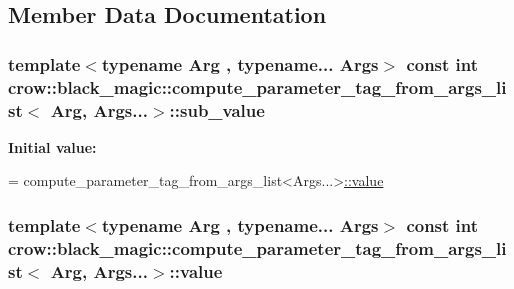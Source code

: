 \subsection{Member Data Documentation}
\hypertarget{structcrow_1_1black__magic_1_1compute__parameter__tag__from__args__list_3_01_arg_00_01_args_8_8_8_4_a4bbefabf41046c28166fcbff53fa4a09}{
\subsubsection[{sub\-\_\-value}]{\setlength{\rightskip}{0pt plus 5cm}template$<$typename Arg , typename... Args$>$ const int {\bf crow\-::black\-\_\-magic\-::compute\-\_\-parameter\-\_\-tag\-\_\-from\-\_\-args\-\_\-list}$<$ Arg, Args...$>$\-::sub\-\_\-value\hspace{0.3cm}{\ttfamily [static]}}}\label{structcrow_1_1black__magic_1_1compute__parameter__tag__from__args__list_3_01_arg_00_01_args_8_8_8_4_a4bbefabf41046c28166fcbff53fa4a09}
{\bfseries Initial value\-:}
\begin{DoxyCode}
= 
                compute\_parameter\_tag\_from\_args\_list<Args...>\hyperlink{structcrow_1_1black__magic_1_1compute__parameter__tag__from__args__list_3_01_arg_00_01_args_8_8_8_4_a14aa3a0f1dc86b1e62539ffcec6701af}{::value}
\end{DoxyCode}
\hypertarget{structcrow_1_1black__magic_1_1compute__parameter__tag__from__args__list_3_01_arg_00_01_args_8_8_8_4_a14aa3a0f1dc86b1e62539ffcec6701af}{
\subsubsection[{value}]{\setlength{\rightskip}{0pt plus 5cm}template$<$typename Arg , typename... Args$>$ const int {\bf crow\-::black\-\_\-magic\-::compute\-\_\-parameter\-\_\-tag\-\_\-from\-\_\-args\-\_\-list}$<$ Arg, Args...$>$\-::value\hspace{0.3cm}{\ttfamily [static]}}}\label{structcrow_1_1black__magic_1_1compute__parameter__tag__from__args__list_3_01_arg_00_01_args_8_8_8_4_a14aa3a0f1dc86b1e62539ffcec6701af}
